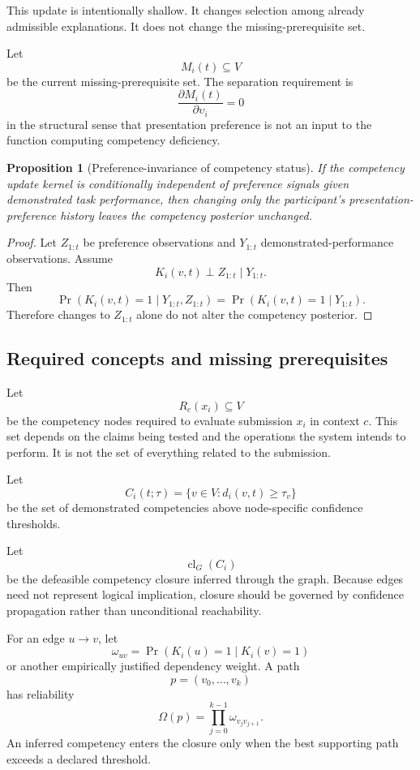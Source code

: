 \documentclass[11pt]{article}
\newtheorem{proposition}[definition]{Proposition}
\theoremstyle{definition}
\DeclareMathOperator{\Prob}{Pr}
\DeclareMathOperator{\closure}{cl}
\begin{document}
This update is intentionally shallow. It changes selection among already admissible explanations. It does not change the missing-prerequisite set.

Let
\[
M_i(t)
\subseteq V
\]
be the current missing-prerequisite set. The separation requirement is
\[
\frac{\partial M_i(t)}{\partial \upsilon_i}=0
\]
in the structural sense that presentation preference is not an input to the function computing competency deficiency.

\begin{proposition}[Preference-invariance of competency status]
If the competency update kernel is conditionally independent of preference signals given demonstrated task performance, then changing only the participant's presentation-preference history leaves the competency posterior unchanged.
\end{proposition}

\begin{proof}
Let \(Z_{1:t}\) be preference observations and \(Y_{1:t}\) demonstrated-performance observations. Assume
\[
K_i(v,t)\perp Z_{1:t}\mid Y_{1:t}.
\]
Then
\[
\Prob(K_i(v,t)=1\mid Y_{1:t},Z_{1:t})
=
\Prob(K_i(v,t)=1\mid Y_{1:t}).
\]
Therefore changes to \(Z_{1:t}\) alone do not alter the competency posterior.
\end{proof}

\subsection{Required concepts and missing prerequisites}

Let
\[
R_c(x_i)\subseteq V
\]
be the competency nodes required to evaluate submission \(x_i\) in context \(c\). This set depends on the claims being tested and the operations the system intends to perform. It is not the set of everything related to the submission.

Let
\[
C_i(t;\tau)
=
\{v\in V:d_i(v,t)\geq\tau_v\}
\]
be the set of demonstrated competencies above node-specific confidence thresholds.

Let
\[
\closure_G(C_i)
\]
be the defeasible competency closure inferred through the graph. Because edges need not represent logical implication, closure should be governed by confidence propagation rather than unconditional reachability.

For an edge \(u\to v\), let
\[
\omega_{uv}
=
\Prob(K_i(u)=1\mid K_i(v)=1)
\]
or another empirically justified dependency weight. A path
\[
p=(v_0,\ldots,v_k)
\]
has reliability
\[
\Omega(p)
=
\prod_{j=0}^{k-1}\omega_{v_jv_{j+1}}.
\]
An inferred competency enters the closure only when the best supporting path exceeds a declared threshold.
\end{document}
